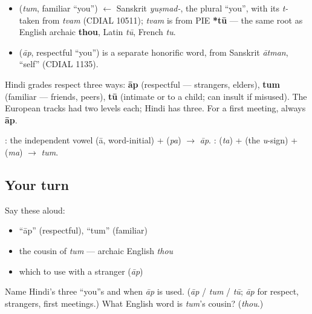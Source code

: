 \begin{cousinweb}
\begin{itemize}
\raggedright
  \item \textbf{} (\emph{tum}, familiar \textquotedblleft{}you\textquotedblright{}) $\leftarrow$ Sanskrit \emph{yuṣmad-}, the plural \textquotedblleft{}you\textquotedblright{}, with its \emph{t-} taken from \emph{tvam} (CDIAL 10511); \emph{tvam} is from PIE \textbf{*tū} — the same root as English archaic \textbf{thou}, Latin \emph{tū}, French \emph{tu}.
  \item \textbf{} (\emph{āp}, respectful \textquotedblleft{}you\textquotedblright{}) is a separate honorific word, from Sanskrit \emph{ātman}, \textquotedblleft{}self\textquotedblright{} (CDIAL 1135).
\end{itemize}
\end{cousinweb}

\begin{grammarlens}[title={Grammar Lens: three levels of \textquotedblleft{}you\textquotedblright{}}]
Hindi grades respect three ways: \textbf{āp} (respectful — strangers, elders), \textbf{tum} (familiar — friends, peers), \textbf{tū} (intimate or to a child; can insult if misused). The European tracks had two levels each; Hindi has three. For a first meeting, always \textbf{āp}.
\end{grammarlens}

\begin{sounds}
: the independent vowel  (ā, word-initial) +  (\emph{pa}) $\to$ \emph{āp}. :  (\emph{ta}) +  (the \emph{u}-sign) +  (\emph{ma}) $\to$ \emph{tum}.
\end{sounds}

\subsection*{Your turn}
Say these aloud:

\begin{itemize}
\raggedright
  \item \textquotedblleft{}āp\textquotedblright{} (respectful), \textquotedblleft{}tum\textquotedblright{} (familiar)
  \item the cousin of \emph{tum} — archaic English \emph{thou}
  \item which to use with a stranger (\emph{āp})
\end{itemize}

\begin{tcolorbox}[breakable,colback=teal!4,colframe=teal!35!black,title={Before you move on}]
Name Hindi's three \textquotedblleft{}you\textquotedblright{}s and when \emph{āp} is used. (\emph{āp} / \emph{tum} / \emph{tū}; \emph{āp} for respect, strangers, first meetings.) What English word is \emph{tum}'s cousin? (\emph{thou}.)
\end{tcolorbox}
